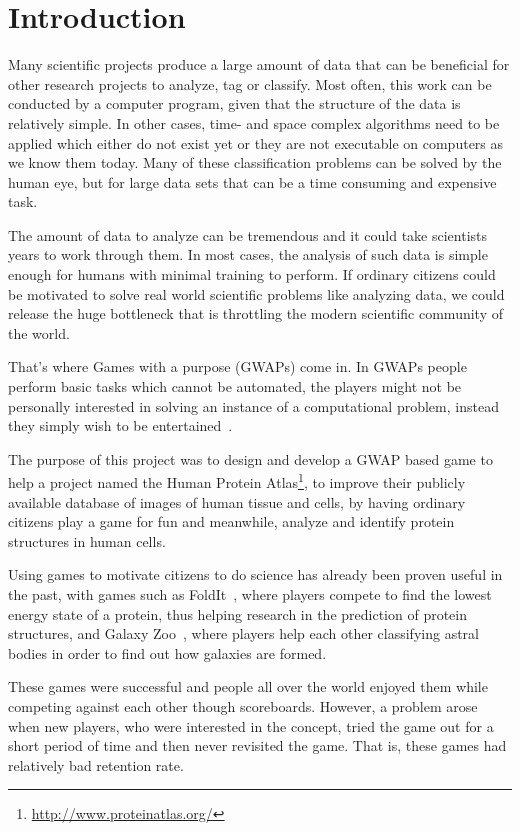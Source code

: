 \section{Introduction}\label{sec:introduction}

Many scientific projects produce a large amount of data that can be beneficial for other research projects to analyze, tag or classify. Most often, this work can be conducted by a computer program, given that the structure of the data is relatively simple. In other cases, time- and space complex algorithms need to be applied which either do not exist yet or they are not executable on computers as we know them today. Many of these classification problems can be solved by the human eye, but for large data sets that can be a time consuming and expensive task.

The amount of data to analyze can be tremendous and it could take scientists years to work through them. In most cases, the analysis of such data is simple enough for humans with minimal training to perform. If ordinary citizens could be motivated to solve real world scientific problems like analyzing data, we could release the huge bottleneck that is throttling the modern scientific community of the world.

That's where Games with a purpose (GWAPs) come in. In GWAPs people perform basic tasks which cannot be automated, the players might not be personally interested in solving an instance of a computational problem, instead they simply wish to be entertained~\cite{GWAP}.

The purpose of this project was to design and develop a GWAP based game to help a project named the Human Protein Atlas\footnote{\url{http://www.proteinatlas.org/}}, to improve their publicly available database of images of human tissue and cells, by having ordinary citizens play a game for fun and meanwhile, analyze and identify protein structures in human cells.

Using games to motivate citizens to do science has already been proven useful in the past, with games such as FoldIt~\cite{foldit}, where players compete to find the lowest energy state of a protein, thus helping research in the prediction of protein structures, and Galaxy Zoo~\cite{galaxyzoo}, where players help each other classifying astral bodies in order to find out how galaxies are formed.

These games were successful and people all over the world enjoyed them while competing against each other though scoreboards. However, a problem arose when new players, who were interested in the concept, tried the game out for a short period of time and then never revisited the game. That is, these games had relatively bad retention rate. ~\cite{sauermann}

